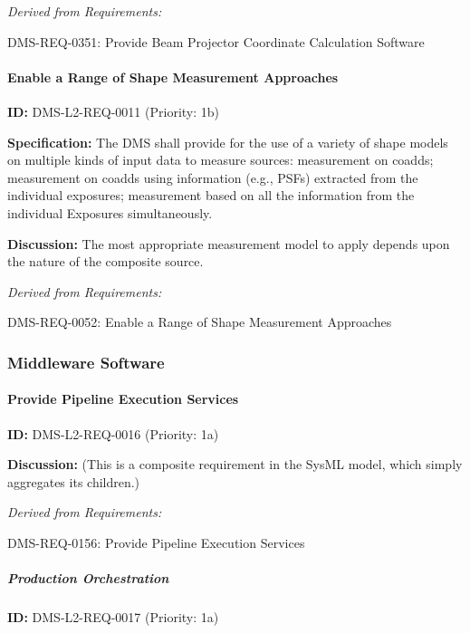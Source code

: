 \documentclass[SE,toc,lsstdraft]{lsstdoc}
\begin{document}
\emph{Derived from Requirements:}

DMS-REQ-0351:
Provide Beam Projector Coordinate Calculation Software \newline

\paragraph{Enable a Range of Shape Measurement Approaches}\hfill  %

\label{DMS-L2-REQ-0011}
\textbf{ID:} DMS-L2-REQ-0011 (Priority: 1b)

\textbf{Specification:} The DMS shall provide for the use of a variety of shape models on multiple kinds of input data to measure sources: measurement on coadds; measurement on coadds using information (e.g., PSFs) extracted from the individual exposures; measurement based on all the information from the individual Exposures simultaneously.

\textbf{Discussion: }The most appropriate measurement model to apply depends upon the nature of the composite source.

\emph{Derived from Requirements:}

DMS-REQ-0052:
Enable a Range of Shape Measurement Approaches \newline

\subsubsection{Middleware Software}

\paragraph{Provide Pipeline Execution Services}\hfill  %

\label{DMS-L2-REQ-0016}
\textbf{ID:} DMS-L2-REQ-0016 (Priority: 1a)

\textbf{Discussion:}
(This is a composite requirement in the SysML model, which simply aggregates its children.)

\emph{Derived from Requirements:}

DMS-REQ-0156:
Provide Pipeline Execution Services \newline

\subparagraph{Production Orchestration}\hfill  %

\label{DMS-L2-REQ-0017}
\textbf{ID:} DMS-L2-REQ-0017 (Priority: 1a)
\end{document}
